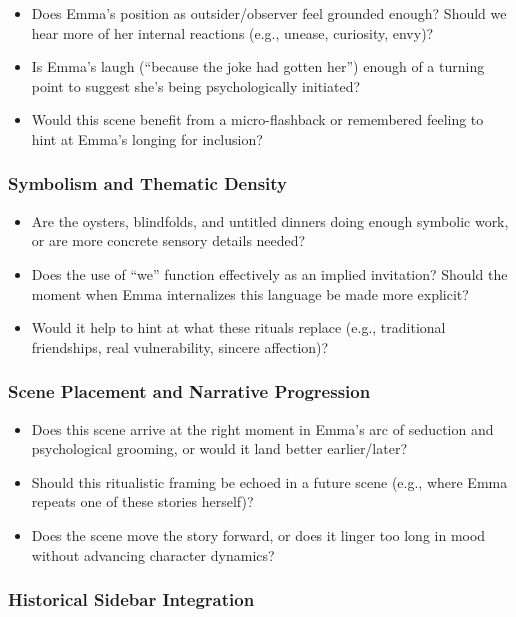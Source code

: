 \begin{itemize}
  \item Does Emma’s position as outsider/observer feel grounded enough? Should we hear more of her internal reactions (e.g., unease, curiosity, envy)?
  \item Is Emma’s laugh (“because the joke had gotten her”) enough of a turning point to suggest she’s being psychologically initiated?
  \item Would this scene benefit from a micro-flashback or remembered feeling to hint at Emma’s longing for inclusion?
\end{itemize}

\subsubsection*{Symbolism and Thematic Density}

\begin{itemize}
  \item Are the oysters, blindfolds, and untitled dinners doing enough symbolic work, or are more concrete sensory details needed?
  \item Does the use of “we” function effectively as an implied invitation? Should the moment when Emma internalizes this language be made more explicit?
  \item Would it help to hint at what these rituals replace (e.g., traditional friendships, real vulnerability, sincere affection)?
\end{itemize}

\subsubsection*{Scene Placement and Narrative Progression}

\begin{itemize}
  \item Does this scene arrive at the right moment in Emma’s arc of seduction and psychological grooming, or would it land better earlier/later?
  \item Should this ritualistic framing be echoed in a future scene (e.g., where Emma repeats one of these stories herself)?
  \item Does the scene move the story forward, or does it linger too long in mood without advancing character dynamics?
\end{itemize}

\subsubsection*{Historical Sidebar Integration}

